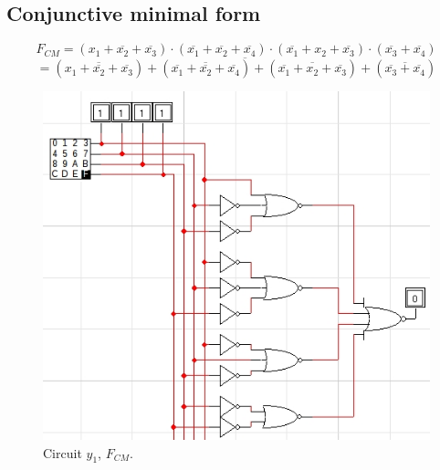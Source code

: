 \documentclass{article}
\begin{document}
		\newpage
		\subsection{Conjunctive minimal form} %
			\[
				\textbf{$F_{CM}$} = 
				(x_1 + \overline{x_2} + \overline{x_3}) \cdot
				(\overline{x_1} + \overline{x_2} + \overline{x_4}) \cdot
				(\overline{x_1} + x_2 + \overline{x_3}) \cdot
				(\overline{x_3} + \overline{x_4})
			\]
			\[
				= \overline{
					(\overline{x_1 + \overline{x_2} + \overline{x_3}}) +
					(\overline{\overline{x_1} + \overline{x_2} + \overline{x_4}}) +
					(\overline{\overline{x_1} + x_2 + \overline{x_3}}) +
					(\overline{\overline{x_3} + \overline{x_4}})
				}
			\]

			\begin{center} \begin{figure}[!ht]
				\begin{mdframed} \begin{center}
					\includegraphics[scale=0.5]{./imgs/Circuit1_FCM_ex1.jpg}
					\caption{Circuit $y_1$, $F_{CM}$.}
				\end{center} \end{mdframed}
				\label{fig:circuit_y1_fcm}
			\end{figure} \end{center}
		
\end{document}
